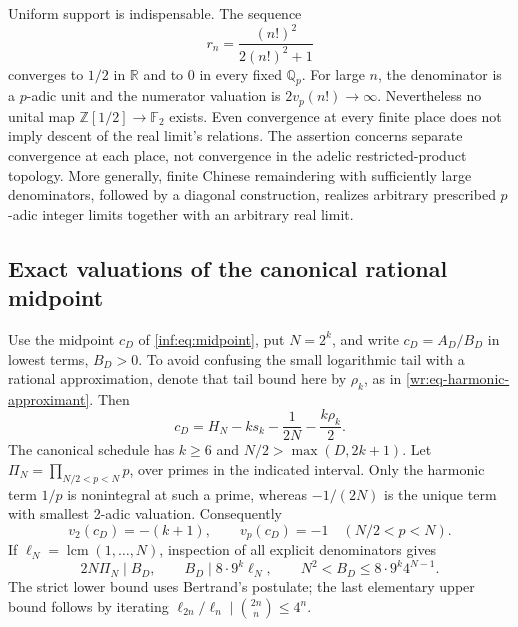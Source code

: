 \documentclass[11pt,a4paper]{article}
\newcommand{\Q}{\mathbb Q}
\newcommand{\R}{\mathbb R}
\newcommand{\Z}{\mathbb Z}
\theoremstyle{definition}
\theoremstyle{remark}
\numberwithin{equation}{section}
\begin{document}
Uniform support is indispensable. The sequence
\begin{equation}\label{wr:eq-all-places-counterexample}
 r_n=\frac{(n!)^2}{2(n!)^2+1}
\end{equation}
converges to \(1/2\) in \(\R\) and to 0 in every fixed \(\Q_p\).
For large \(n\), the denominator is a \(p\)-adic unit and the numerator
valuation is \(2v_p(n!)\to\infty\). Nevertheless no unital map
\(\Z[1/2]\to\mathbb F_2\) exists. Even convergence at every finite
place does not imply descent of the real limit's relations.
The assertion concerns separate convergence at each place, not
convergence in the adelic restricted-product topology. More generally,
finite Chinese remaindering with sufficiently large denominators,
followed by a diagonal construction, realizes arbitrary prescribed
\(p\)-adic integer limits together with an arbitrary real limit.

\subsection{Exact valuations of the canonical rational midpoint}

Use the midpoint \(c_D\) of \eqref{inf:eq:midpoint}, put
\(N=2^k\), and write \(c_D=A_D/B_D\) in lowest terms, \(B_D>0\).
To avoid confusing the small logarithmic tail with a rational
approximation, denote that tail bound here by \(\rho_k\), as in
\eqref{wr:eq-harmonic-approximant}. Then
\[
 c_D=H_N-ks_k-\frac1{2N}-\frac{k\rho_k}{2}.
\]
The canonical schedule has \(k\ge6\) and \(N/2>\max(D,2k+1)\).
Let \(\Pi_N=\prod_{N/2<p<N}p\), over primes in the indicated interval.
Only the harmonic term \(1/p\) is nonintegral at such a prime, whereas
\(-1/(2N)\) is the unique term with smallest 2-adic valuation.
Consequently
\begin{equation}\label{wr:eq-midpoint-valuations}
 v_2(c_D)=-(k+1),\qquad v_p(c_D)=-1\quad(N/2<p<N).
\end{equation}
If \(\ell_N=\operatorname{lcm}(1,\ldots,N)\), inspection of all
explicit denominators gives
\begin{equation}\label{wr:eq-midpoint-denominator}
 2N\Pi_N\mid B_D,\qquad B_D\mid8\cdot9^k\ell_N,\qquad
 N^2<B_D\le8\cdot9^k4^{N-1}.
\end{equation}
The strict lower bound uses Bertrand's postulate; the last elementary
upper bound follows by iterating
\(\ell_{2n}/\ell_n\mid\binom{2n}{n}\le4^n\).
\end{document}
